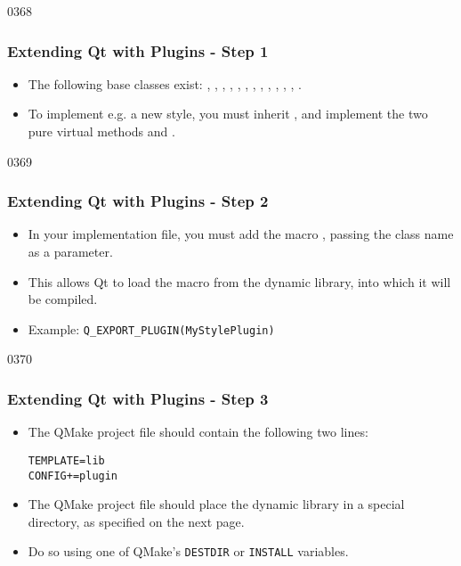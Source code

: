\begin{slide}{0368}\frametitle{Extending Qt with Plugins - Step 1}
\begin{itemize}
\item The following base classes exist: ,
  , ,
  , ,
  , ,
  , ,
  , ,
  , .
\item To implement e.g. a new style, you must inherit
  , and implement the two pure virtual methods
   and .
\end{itemize}
\end{slide}

\begin{slide}{0369}\frametitle{Extending Qt with Plugins - Step 2}
\begin{itemize}
\item In your implementation file, you must add the macro
  , passing the class name as a parameter.
\item This allows Qt to load the macro from the dynamic library, into which
  it will be compiled.
\item Example: \texttt{Q\_EXPORT\_PLUGIN(MyStylePlugin)}
\end{itemize}
\end{slide}

\begin{slide}[fragile]{0370} 
\frametitle{Extending Qt with Plugins - Step 3}
\begin{itemize}
\item The QMake project file should contain the following two lines:
\begin{alltt}
  TEMPLATE = lib
  CONFIG += plugin
\end{alltt}
\item The QMake project file should place the dynamic library in a special
  directory, as specified on the next page.
\item Do so using one of QMake's \texttt{DESTDIR} or \texttt{INSTALL}
  variables.
\end{itemize}
\end{slide}

